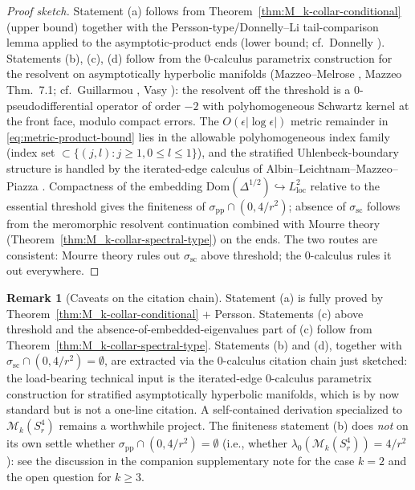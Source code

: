 \documentclass[11pt,letterpaper]{article}
\theoremstyle{definition}
\newtheorem{remark}[theorem]{Remark}
\newcommand{\cM}{\mathcal{M}}
\newcommand{\Lap}{\Delta}
\begin{document}
\begin{proof}[Proof sketch]
Statement (a) follows from Theorem~\ref{thm:M_k-collar-conditional} (upper bound) together with the Persson-type/Donnelly--Li tail-comparison lemma applied to the asymptotic-product ends (lower bound; cf.\ Donnelly \cite{Donnelly1981}). Statements (b), (c), (d) follow from the 0-calculus parametrix construction for the resolvent on asymptotically hyperbolic manifolds (Mazzeo--Melrose \cite{MazzeoMelrose1987}, Mazzeo \cite{Mazzeo1991} Thm.~7.1; cf.\ Guillarmou \cite{Guillarmou2005}, Vasy \cite{Vasy2013}): the resolvent off the threshold is a $0$-pseudodifferential operator of order $-2$ with polyhomogeneous Schwartz kernel at the front face, modulo compact errors. The $O(\epsilon|\log\epsilon|)$ metric remainder in \eqref{eq:metric-product-bound} lies in the allowable polyhomogeneous index family (index set $\subset \{(j,l) : j \ge 1, 0 \le l \le 1\}$), and the stratified Uhlenbeck-boundary structure is handled by the iterated-edge calculus of Albin--Leichtnam--Mazzeo--Piazza \cite{ALMP2012}. Compactness of the embedding $\mathrm{Dom}(\Lap^{1/2}) \hookrightarrow L^2_{\mathrm{loc}}$ relative to the essential threshold gives the finiteness of $\sigma_{\mathrm{pp}}\cap(0, 4/r^2)$; absence of $\sigma_{\mathrm{sc}}$ follows from the meromorphic resolvent continuation combined with Mourre theory (Theorem~\ref{thm:M_k-collar-spectral-type}) on the ends. The two routes are consistent: Mourre theory rules out $\sigma_{\mathrm{sc}}$ above threshold; the 0-calculus rules it out everywhere.
\end{proof}

\begin{remark}[Caveats on the citation chain]\label{rmk:MM-caveats}
Statement (a) is fully proved by Theorem~\ref{thm:M_k-collar-conditional} + Persson. Statements (c) above threshold and the absence-of-embedded-eigenvalues part of (c) follow from Theorem~\ref{thm:M_k-collar-spectral-type}. Statements (b) and (d), together with $\sigma_{\mathrm{sc}}\cap(0, 4/r^2) = \emptyset$, are extracted via the 0-calculus citation chain just sketched: the load-bearing technical input is the iterated-edge $0$-calculus parametrix construction for stratified asymptotically hyperbolic manifolds, which is by now standard but is not a one-line citation. A self-contained derivation specialized to $\cM_k(S^4_r)$ remains a worthwhile project. The finiteness statement (b) does \emph{not} on its own settle whether $\sigma_{\mathrm{pp}}\cap (0, 4/r^2) = \emptyset$ (i.e., whether $\lambda_0(\cM_k(S^4_r)) = 4/r^2$): see the discussion in the companion supplementary note for the case $k=2$ and the open question for $k\ge 3$.
\end{remark}
\fi
\end{document}
